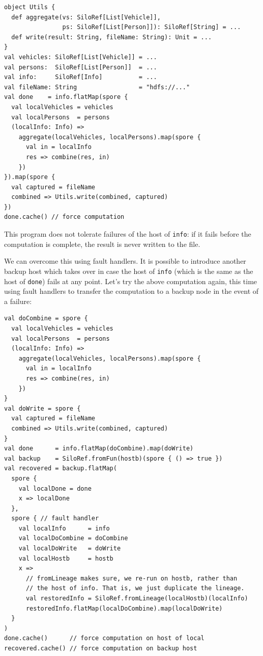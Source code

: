 \documentclass[10pt]{sigplanconf}
\theoremstyle{definition}
\theoremstyle{definition}
\begin{document}
\vspace{-0.8mm}
\begin{lstlisting}
object Utils {
  def aggregate(vs: SiloRef[List[Vehicle]],
                ps: SiloRef[List[Person]]): SiloRef[String] = ...
  def write(result: String, fileName: String): Unit = ...
}
val vehicles: SiloRef[List[Vehicle]] = ...
val persons:  SiloRef[List[Person]]  = ...
val info:     SiloRef[Info]          = ...
val fileName: String                 = "hdfs://..."
val done    = info.flatMap(spore {
  val localVehicles = vehicles
  val localPersons  = persons
  (localInfo: Info) =>
    aggregate(localVehicles, localPersons).map(spore {
      val in = localInfo
      res => combine(res, in)
    })
}).map(spore {
  val captured = fileName
  combined => Utils.write(combined, captured)
})
done.cache() // force computation
\end{lstlisting}
\noindent
This program does not tolerate failures of the host of \verb|info|: if
it fails before the computation is complete, the result is never
written to the file.

We can overcome this using fault handlers. It is possible to introduce
another backup host which takes over in case the host of \verb|info|
(which is the same as the host of \verb|done|) fails at any
point. Let's try the above computation again, this time using fault
handlers to transfer the computation to a backup node in the event of
a failure:

\begin{lstlisting}
val doCombine = spore {
  val localVehicles = vehicles
  val localPersons  = persons
  (localInfo: Info) =>
    aggregate(localVehicles, localPersons).map(spore {
      val in = localInfo
      res => combine(res, in)
    })
}
val doWrite = spore {
  val captured = fileName
  combined => Utils.write(combined, captured)
}
val done      = info.flatMap(doCombine).map(doWrite)
val backup    = SiloRef.fromFun(hostb)(spore { () => true })
val recovered = backup.flatMap(
  spore {
    val localDone = done
    x => localDone
  },
  spore { // fault handler
    val localInfo      = info
    val localDoCombine = doCombine
    val localDoWrite   = doWrite
    val localHostb     = hostb
    x =>
      // fromLineage makes sure, we re-run on hostb, rather than
      // the host of info. That is, we just duplicate the lineage.
      val restoredInfo = SiloRef.fromLineage(localHostb)(localInfo)
      restoredInfo.flatMap(localDoCombine).map(localDoWrite)
  }
)
done.cache()      // force computation on host of local
recovered.cache() // force computation on backup host
\end{lstlisting}
\noindent
\end{document}
